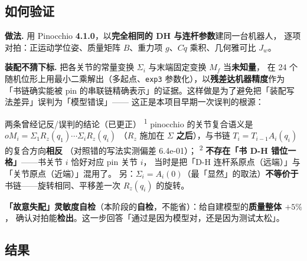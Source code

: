 \documentclass[11pt,a4paper]{ctexart}
\newcommand{\stage}[1]{\textsuperscript{#1}}
\begin{document}
\subsection{如何验证}

\textbf{做法.} 用 Pinocchio \textbf{4.1.0}，以\textbf{完全相同的 DH 与连杆参数}建同一台机器人，
逐项对拍：正运动学位姿、质量矩阵 $B$、重力项 $g$、$C\dot q$ 乘积、几何雅可比 $J_w$。

\textbf{装配不猜下标.} 把各关节的常量变换 $\Sigma_i$ 与末端固定变换 $M_f$ 当\textbf{未知量}，
在 24 个随机位形上用最小二乘解出（多起点、\texttt{exp3} 参数化），以\textbf{残差达机器精度}作为
「书链确实能被 pin 的串联链精确表示」的证据。这样做是为了避免把「装配写法差异」误判为「模型错误」——
这正是本项目早期一次误判的根源：

\begin{warnbox}{两条曾经记反/误判的结论（已更正）}
\stage{1} pinocchio 的关节复合语义是 $oM_i=\Sigma_1R_z(q_1)\cdots\Sigma_iR_z(q_i)$
（$R_z$ 施加在 $\Sigma$ \textbf{之后}），与书链 $T_i=T_{i-1}A_i(q_i)$ 的复合方向\textbf{相反}
（对照错的写法实测偏差 6.4e-01）；
\stage{2} \textbf{不存在「书 D-H 错位一格」}——书关节 $i$ 恰好对应 pin 关节 $i$，
当时是把「D-H 连杆系原点（远端）」与「关节原点（近端）」混用了。
另：$\Sigma_i=A_i(0)$（最「显然」的取法）\textbf{不等价于}书链——旋转相同、平移差一次 $R_z(q_i)$ 的旋转。
\end{warnbox}

\textbf{「故意失配」灵敏度自检}（本阶段的\textbf{自检}，不能省）：给自建模型的\textbf{质量整体 $+5\%$}，
确认对拍能\textbf{检出}。这一步回答「通过是因为模型对，还是因为测试太松」。

\subsection{结果}

\begin{table}[H]
\centering
\small
{}
\end{table}
\end{document}
